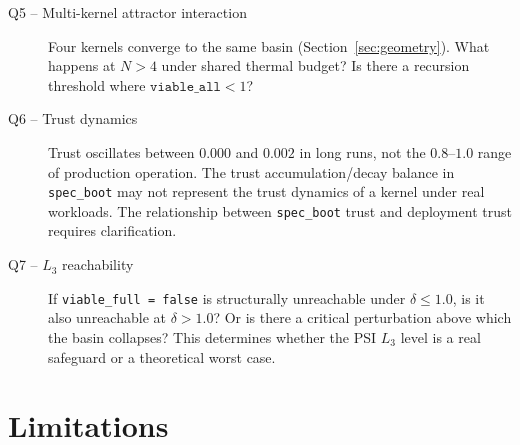 \documentclass[11pt, a4paper]{article}
\begin{document}
\begin{description}
  \item[Q5 -- Multi-kernel attractor interaction]
    Four kernels converge to the same basin (Section~\ref{sec:geometry}).
    What happens at $N > 4$ under shared thermal budget?
    Is there a recursion threshold where $\texttt{viable\_all} < 1$?

  \item[Q6 -- Trust dynamics]
    Trust oscillates between $0.000$ and $0.002$ in long runs,
    not the $0.8$--$1.0$ range of production operation.
    The trust accumulation/decay balance in \texttt{spec\_boot} may not
    represent the trust dynamics of a kernel under real workloads.
    The relationship between \texttt{spec\_boot} trust and deployment
    trust requires clarification.

  \item[Q7 -- $L_3$ reachability]
    If \texttt{viable\_full = false} is structurally unreachable under
    $\delta \le 1.0$, is it also unreachable at $\delta > 1.0$?
    Or is there a critical perturbation above which the basin collapses?
    This determines whether the PSI $L_3$ level is a real safeguard or
    a theoretical worst case.

\end{description}


\section{Limitations}
\label{sec:limitations}
\end{document}
